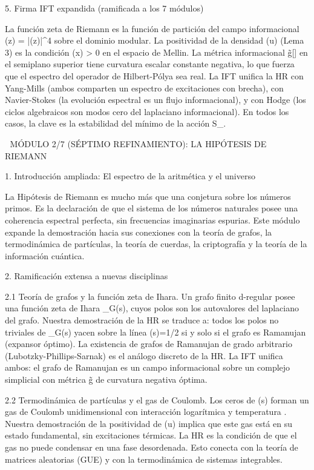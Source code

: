 \documentclass[12pt,a4paper]{book}
\begin{document}
5. Firma IFT expandida (ramificada a los 7 módulos)

La función zeta de Riemann es la función de partición del campo informacional \rho(z) = |\eta(z)|^4 sobre el dominio modular. La positividad de la densidad \Phi(u) (Lema 3) es la condición \rho(x) > 0 en el espacio de Mellin. La métrica informacional g̃[\rho] en el semiplano superior tiene curvatura escalar constante negativa, lo que fuerza que el espectro del operador de Hilbert-Pólya sea real. La IFT unifica la HR con Yang-Mills (ambos comparten un espectro de excitaciones con brecha), con Navier-Stokes (la evolución espectral es un flujo informacional), y con Hodge (los ciclos algebraicos son modos cero del laplaciano informacional). En todos los casos, la clave es la estabilidad del mínimo de la acción S_{}.

🧬 MÓDULO 2/7 (SÉPTIMO REFINAMIENTO): LA HIPÓTESIS DE RIEMANN

1. Introducción ampliada: El espectro de la aritmética y el universo

La Hipótesis de Riemann es mucho más que una conjetura sobre los números primos. Es la declaración de que el sistema de los números naturales posee una coherencia espectral perfecta, sin frecuencias imaginarias espurias. Este módulo expande la demostración hacia sus conexiones con la teoría de grafos, la termodinámica de partículas, la teoría de cuerdas, la criptografía y la teoría de la información cuántica.

2. Ramificación extensa a nuevas disciplinas

2.1 Teoría de grafos y la función zeta de Ihara.
Un grafo finito d-regular posee una función zeta de Ihara \zeta_G(s), cuyos polos son los autovalores del laplaciano del grafo. Nuestra demostración de la HR se traduce a: todos los polos no triviales de \zeta_G(s) yacen sobre la línea \Re(s)=1/2 si y solo si el grafo es Ramanujan (expansor óptimo). La existencia de grafos de Ramanujan de grado arbitrario (Lubotzky-Phillips-Sarnak) es el análogo discreto de la HR. La IFT unifica ambos: el grafo de Ramanujan es un campo informacional \rho sobre un complejo simplicial con métrica g̃ de curvatura negativa óptima.

2.2 Termodinámica de partículas y el gas de Coulomb.
Los ceros de \zeta(s) forman un gas de Coulomb unidimensional con interacción logarítmica y temperatura . Nuestra demostración de la positividad de \Phi(u) implica que este gas está en su estado fundamental, sin excitaciones térmicas. La HR es la condición de que el gas no puede condensar en una fase desordenada. Esto conecta con la teoría de matrices aleatorias (GUE) y con la termodinámica de sistemas integrables.
\end{document}

